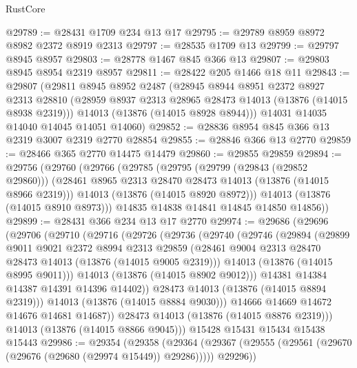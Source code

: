 \begin{lexlean}{RustCore}
\begin{coremodule}
@29789 := @28431 @1709 @234 @13 @17
@29795 := @29789 @8959 @8972 @8982 @2372 @8919 @2313
@29797 := @28535 @1709 @13
@29799 := @29797 @8945 @8957
@29803 := @28778 @1467 @845 @366 @13
@29807 := @29803 @8945 @8954 @2319 @8957
@29811 := @28422 @205 @1466 @18 @11
@29843 := @29807
    (@29811
      @8945
      @8952
      @2487
      (@28945
        @8944
        @8951
        @2372
        @8927
        @2313
        @28810
        (@28959 @8937 @2313 @28965 @28473 @14013 (@13876 (@14015 @8938 @2319)))
        @14013
        (@13876 (@14015 @8928 @8944)))
      @14031
      @14035
      @14040
      @14045
      @14051
      @14060)
@29852 := @28836 @8954 @845 @366 @13 @2319 @3007 @2319 @2770 @28854
@29855 := @28846 @366 @13 @2770
@29859 := @28466 @365 @2770 @14475 @14479
@29860 := @29855 @29859
@29894 := @29756
    (@29760
      (@29766
        (@29785
          (@29795
            (@29799 (@29843 (@29852 @29860)))
            (@28461 @8965 @2313 @28470 @28473 @14013 (@13876 (@14015 @8966 @2319)))
            @14013
            (@13876 (@14015 @8920 @8972)))
          @14013
          (@13876 (@14015 @8910 @8973)))
        @14835
        @14838
        @14841
        @14845
        @14850
        @14856))
@29899 := @28431 @366 @234 @13 @17 @2770
@29974 := @29686
    (@29696
      (@29706
        (@29710
          (@29716
            (@29726
              (@29736
                (@29740
                  (@29746
                    (@29894
                      (@29899
                        @9011
                        @9021
                        @2372
                        @8994
                        @2313
                        @29859
                        (@28461 @9004 @2313 @28470 @28473 @14013 (@13876 (@14015 @9005 @2319)))
                        @14013
                        (@13876 (@14015 @8995 @9011)))
                      @14013
                      (@13876 (@14015 @8902 @9012)))
                    @14381
                    @14384
                    @14387
                    @14391
                    @14396
                    @14402))
                @28473
                @14013
                (@13876 (@14015 @8894 @2319)))
              @14013
              (@13876 (@14015 @8884 @9030)))
            @14666
            @14669
            @14672
            @14676
            @14681
            @14687))
        @28473
        @14013
        (@13876 (@14015 @8876 @2319)))
      @14013
      (@13876 (@14015 @8866 @9045)))
    @15428
    @15431
    @15434
    @15438
    @15443
@29986 := @29354
    (@29358
      (@29364 (@29367 (@29555 (@29561 (@29670 (@29676 (@29680 (@29974 @15449)) @29286))))) @29296))

\end{coremodule}
\end{lexlean}
